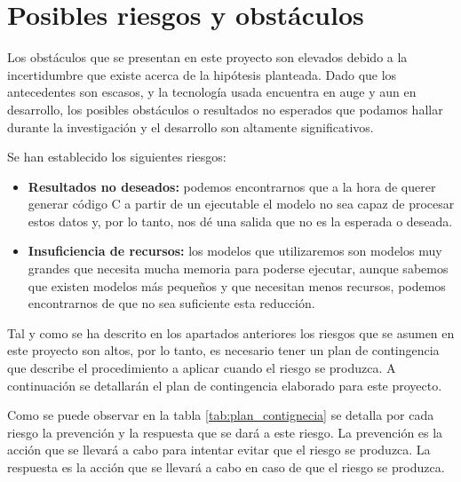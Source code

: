 \section{Posibles riesgos y obstáculos}
\label{sec:riesgos}


Los obstáculos que se presentan en este proyecto son elevados debido a la incertidumbre
que existe acerca de la hipótesis planteada. Dado que los antecedentes son escasos, y
la tecnología usada encuentra en auge y aun en desarrollo, los posibles obstáculos
o resultados no esperados que podamos hallar durante la investigación y el desarrollo
son altamente significativos.

Se han establecido los siguientes riesgos:

\begin{itemize}
    \item \textbf{Resultados no deseados:} podemos encontrarnos que a la hora de querer
        generar código C a partir de un ejecutable el modelo no sea capaz de procesar estos datos
        y, por lo tanto, nos dé una salida que no es la esperada o deseada.
    \item \textbf{Insuficiencia de recursos:} los modelos que utilizaremos son modelos
        muy grandes que necesita mucha memoria para poderse ejecutar, aunque sabemos que
        existen modelos más pequeños y que necesitan menos recursos, podemos encontrarnos de
        que no sea suficiente esta reducción.
\end{itemize}

Tal y como se ha descrito en los apartados anteriores los riesgos que se asumen en este
proyecto son altos, por lo tanto, es necesario tener un plan de contingencia que describe
el procedimiento a aplicar cuando el riesgo se produzca. A continuación se detallarán
el plan de contingencia elaborado para este proyecto.

Como se puede observar en la tabla \ref{tab:plan_contignecia} se detalla por cada riesgo
la prevención y la respuesta que se dará a este riesgo. La prevención es la acción que se
llevará a cabo para intentar evitar que el riesgo se produzca. La respuesta es la acción
que se llevará a cabo en caso de que el riesgo se produzca.

